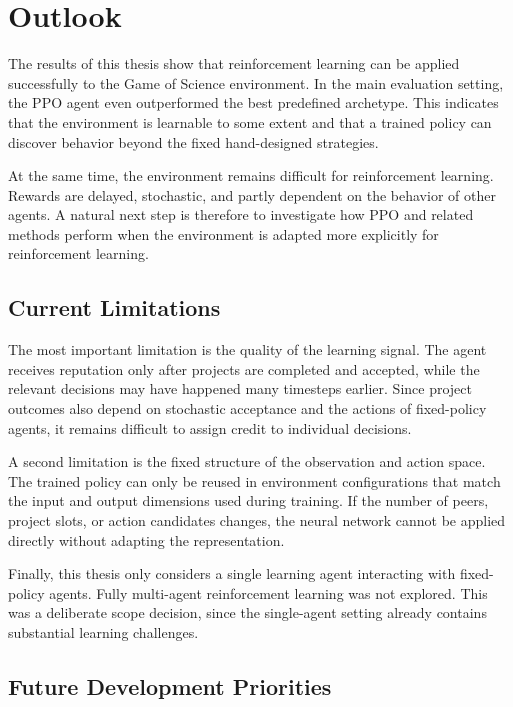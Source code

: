 \documentclass[english,bachelor]{hsluthesis}
\begin{document}
\chapter{Outlook}

The results of this thesis show that reinforcement learning can be applied successfully to the Game of Science environment. In the main evaluation setting, the PPO agent even outperformed the best predefined archetype. This indicates that the environment is learnable to some extent and that a trained policy can discover behavior beyond the fixed hand-designed strategies.

At the same time, the environment remains difficult for reinforcement learning. Rewards are delayed, stochastic, and partly dependent on the behavior of other agents. A natural next step is therefore to investigate how PPO and related methods perform when the environment is adapted more explicitly for reinforcement learning.

\section{Current Limitations}

The most important limitation is the quality of the learning signal. The agent receives reputation only after projects are completed and accepted, while the relevant decisions may have happened many timesteps earlier. Since project outcomes also depend on stochastic acceptance and the actions of fixed-policy agents, it remains difficult to assign credit to individual decisions.

A second limitation is the fixed structure of the observation and action space. The trained policy can only be reused in environment configurations that match the input and output dimensions used during training. If the number of peers, project slots, or action candidates changes, the neural network cannot be applied directly without adapting the representation.

Finally, this thesis only considers a single learning agent interacting with fixed-policy agents. Fully multi-agent reinforcement learning was not explored. This was a deliberate scope decision, since the single-agent setting already contains substantial learning challenges.

\section{Future Development Priorities}
\end{document}
